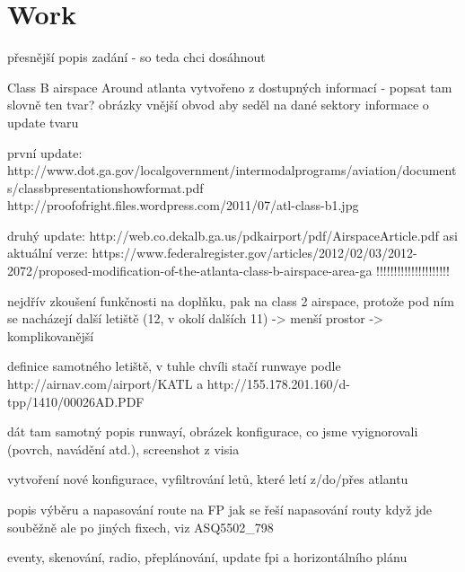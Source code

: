 \chapter{Work}

přesnější popis zadání - so teda chci dosáhnout

Class B airspace Around atlanta
vytvořeno z dostupných informací - popsat tam slovně ten tvar?
obrázky
vnější obvod aby seděl na dané sektory
informace o update tvaru

první update:
http://www.dot.ga.gov/localgovernment/intermodalprograms/aviation/documents/classbpresentationshowformat.pdf
http://proofofright.files.wordpress.com/2011/07/atl-class-b1.jpg

druhý update:
http://web.co.dekalb.ga.us/pdkairport/pdf/AirspaceArticle.pdf
asi aktuální verze:
https://www.federalregister.gov/articles/2012/02/03/2012-2072/proposed-modification-of-the-atlanta-class-b-airspace-area-ga !!!!!!!!!!!!!!!!!!!!!

nejdřív zkoušení funkčnosti na doplňku, pak na class 2 airspace, protože pod ním se nacházejí další letiště (12, v okolí dalších 11) -> menší prostor -> komplikovanější



definice samotného letiště,
v tuhle chvíli stačí runwaye
podle
http://airnav.com/airport/KATL a http://155.178.201.160/d-tpp/1410/00026AD.PDF

dát tam samotný popis runwayí, obrázek konfigurace, co jsme vyignorovali (povrch, navádění atd.), screenshot z visia 





vytvoření nové konfigurace, vyfiltrování letů, které letí z/do/přes atlantu

popis výběru a napasování route na FP
jak se řeší napasování routy když jde souběžně ale po jiných fixech, viz ASQ5502_798


eventy, skenování, radio, přeplánování, update fpi a horizontálního plánu


